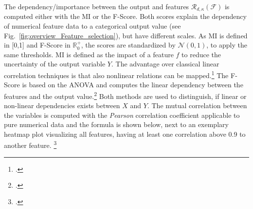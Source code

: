 The dependency/importance between the output and features $\mathcal{R}_{d,\kappa}(\mathcal{F})$ is computed either with the
\gls{MI} or the \gls{F-Score}. Both scores explain the dependency of numerical feature data to a categorical output value (see Fig.~\ref{fig:overview_Feature_selection}),
but have different scales. As \gls{MI} is defined in [0,1] and \gls{F-Score} in $\mathbb{R}_0^+$, the scores are standardized by $\mathcal{N}(0,1)$, to
apply the same thresholds. \gls{MI} is defined as the impact of a feature $f$ to reduce the uncertainty of the output variable $Y$.
The advantage over classical linear correlation techniques is that also nonlinear relations can be mapped.\footcite[cf.][p. 539f]{battiti_using_1994}
The \gls{F-Score} is based on the \gls{ANOVA} and computes the linear dependency between the features and the output value.\footcite[cf.][p. 2]{gu_generalized_2012}
Both methods are used to distinguish, if linear or non-linear dependencies exists between $X$ and $Y$. The mutual correlation between the variables
is computed with the \textit{Pearson} correlation coefficient applicable to pure numerical data and the formula is shown below,
next to an exemplary heatmap plot visualizing all features, having at least one correlation above 0.9 to another feature. \footcite[cf.][p. 17]{chandrashekar_survey_2014}
